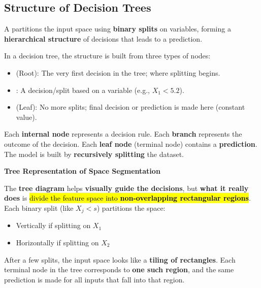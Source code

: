 \subsection{Structure of Decision Trees}

A  partitions the input space using \textbf{binary splits} on variables, forming a \textbf{hierarchical structure} of decisions that leads to a prediction.

\highspace
In a decision tree, the structure is built from three types of nodes:
\begin{itemize}
    \item {} (Root): The very first decision in the tree; where splitting begins.
    \item {}: A decision/split based on a variable (e.g., $X_1 < 5.2$).
    \item {} (Leaf): No more splits; final decision or prediction is made here (constant value).
\end{itemize}
Each \textbf{internal node} represents a decision rule. Each \textbf{branch} represents the outcome of the decision. Each \textbf{leaf node} (terminal node) contains a \textbf{prediction}. The model is built by \textbf{recursively splitting} the dataset.

\highspace
\begin{flushleft}
    \textcolor{Green3}{ \textbf{Tree Representation of Space Segmentation}}
\end{flushleft}
The \textbf{tree diagram} helps \textbf{visually guide the decisions}, but \textbf{what it really does} is \hl{divide the feature space into \textbf{non-overlapping rectangular regions}}. Each binary split (like $X_j < s$) partitions the space:
\begin{itemize}
    \item Vertically if splitting on $X_1$
    \item Horizontally if splitting on $X_2$
\end{itemize}
After a few splits, the input space looks like a \textbf{tiling of rectangles}. Each terminal node in the tree corresponds to \textbf{one such region}, and the same prediction is made for all inputs that fall into that region.

